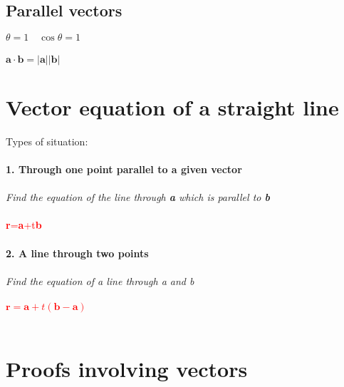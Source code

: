 \documentclass{article}[18pt]
\begin{document}
\subsection{Parallel vectors}
$\theta=1 \quad \cos\theta=1$\\
\\
$\mathbf{a}\cdot \mathbf{b}=|\mathbf{a}||\mathbf{b}|$
\\
\section{Vector equation of a straight line}
Types of situation:\\
\\
\textbf{1. Through one point parallel to a given vector}\\
\\
\textit{Find the equation of the line through \textbf{a} which is parallel to \textbf{b}}\\
\\
\textcolor{red}{\textbf{r}=\textbf{a}+t\textbf{b}}\\
\\
\textbf{2. A line through two points}\\
\\
\textit{Find the equation of a line through a and b}\\
\\
\textcolor{red}{$\mathbf{r}=\mathbf{a}+t(\mathbf{b-a})$}\\
\\
\section{Proofs involving vectors}
\end{document}
